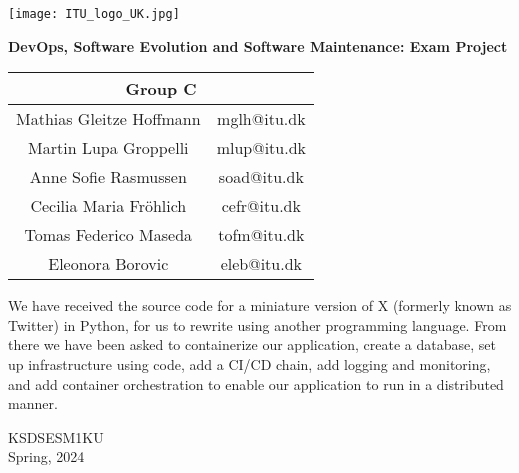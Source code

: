 \begin{titlepage}
        \vspace*{-7em}
        \hbox{\hspace{15.2em}\texttt{[image: ITU\_logo\_UK.jpg]}}
        \vspace*{4em}
    \begin{center}
        \centering 
        \vspace*{0.5cm}
        \LARGE
        \textbf{DevOps, Software Evolution and Software Maintenance: Exam Project}

        \vspace{1.5cm}
        
        \large
        \begin{center}
        \begin{tabular}{ |c|c| } 
        \hline
        \multicolumn{2}{|c|}{Group C}\\
        [0.5em]
        \hline
        Mathias Gleitze Hoffmann & mglh@itu.dk \\ 
        Martin Lupa Groppelli & mlup@itu.dk \\ 
        Anne Sofie Rasmussen & soad@itu.dk \\ 
        Cecilia Maria Fröhlich & cefr@itu.dk \\ 
        Tomas Federico Maseda & tofm@itu.dk \\ 
        Eleonora Borovic & eleb@itu.dk \\ 
        \hline
        \end{tabular}
        \end{center}
         
        \vspace{1cm}
        \normalsize

We have received the source code for a miniature version of X (formerly known as Twitter) in Python, for us to rewrite using another programming language. From there we have been asked to containerize our application, create a database, set up infrastructure using code, add a CI/CD chain, add logging and monitoring, and add container orchestration to enable our application to run in a distributed manner.

        \vfill

        
        KSDSESM1KU\\
        Spring, 2024
             
    \end{center}
\end{titlepage}